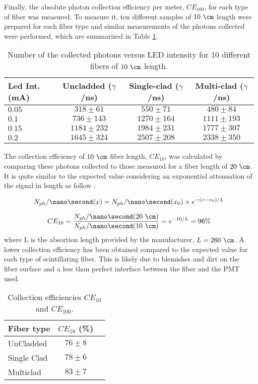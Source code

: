 Finally, the absolute photon collection efficiency per meter, $CE_{100}$, for each type of fiber was measured. To measure it, ten different samples of $10~\cm$ length were prepared for each fiber type and similar measurements of the photons collected were performed, which are summarized in Table \ref{tab:10DifferentSamplesAlltypes}.

\begin{table}[htbp]
\centering{}%
\begin{tabular}{lccc}
\toprule 
Led Int. (mA) & Uncladded ($\gamma$/ns) & Single-clad ($\gamma$/ns) & Multi-clad ($\gamma$/ns) \tabularnewline
\midrule
\midrule 
$0.05$ & $318 \pm 61$ & $550 \pm 71$ & $480 \pm 84$ \tabularnewline
$0.1$ & $736 \pm 143$ & $1270 \pm 164$ & $1111 \pm 193$ \tabularnewline
$0.15$ & $1184 \pm 232$ & $1984 \pm 231$ & $1777\pm 307$ \tabularnewline
$0.2$ & $1645 \pm 324$ & $2507 \pm 208$ & $2338 \pm 350$ \tabularnewline
\bottomrule
\end{tabular}
\caption{Number of the collected photons versus LED intensity for 10 different fibers of $10~\cm$ length.}
\label{tab:10DifferentSamplesAlltypes}
\end{table}
The collection efficiency of $10~\cm$ fiber length, $CE_{10}$, was calculated by comparing these photons collected to those measured for a fiber length of $20~\cm$. It is quite similar to the expected value considering an exponential attenuation of the signal in length as follow \cite{Leo}.

\begin{equation}
N_{ph}/\nano\second(x) = N_{ph}/\nano\second(x_0) \times e^{-(x-x_0)/L}
\label{eq:ExponentialAttenuation}
\end{equation}

\begin{equation}
CE_{10}=\frac{N_{ph}/\nano\second(20~\cm)}{N_{ph}/\nano\second(10~\cm)}=e^{-10/L}=96\%
\label{eq:CollectionEfficiency}
\end{equation}
where L is the absortion length provided by the manufacturer, $L=260~\cm$. A lower collection efficiency has been obtained compared to the expected value for each type of scintillating fiber. This is likely due to blemishes and dirt on the fiber surface and a less than perfect interface between the fiber and the PMT used.

\begin{table}[htbp]
\centering{}%
\begin{tabular}{lcc}
\toprule 
Fiber type & $CE_{10}$ (\%) \tabularnewline
\midrule
\midrule 
UnCladded & $76 \pm 8$ \tabularnewline
Single Clad & $78 \pm 6$ \tabularnewline
Multiclad & $83 \pm 7$ \tabularnewline
\bottomrule
\end{tabular}
\caption{Collection efficiencies $CE_{10}$ and $CE_{100}$.}
\label{tab:CollectionEfficiencyOfFibers}
\end{table}


